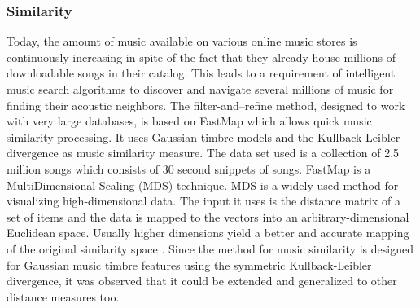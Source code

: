 \documentclass{proc}
\begin{document}
\subsubsection{Similarity}
Today, the amount of music available on various online music stores is continuously increasing in spite of the fact that they already house millions of downloadable songs in their catalog. This leads to a requirement of intelligent music search algorithms to discover and navigate several millions of music for finding their acoustic neighbors. The filter-and–refine method, designed to work with very large databases, is based on FastMap which allows quick music similarity processing. It uses Gaussian timbre models and the Kullback-Leibler divergence as music similarity measure. The data set used is a collection of 2.5 million songs which consists of 30 second snippets of songs. FastMap is a MultiDimensional Scaling (MDS) technique. MDS is a widely used method for visualizing high-dimensional data. The input it uses is the distance matrix of a set of items and the data is mapped to the vectors into an arbitrary-dimensional Euclidean space. Usually higher dimensions yield a better and accurate mapping of the original similarity space \cite{Schnitzer2009}. Since the method for music similarity is designed for Gaussian music timbre features using the symmetric Kullback-Leibler divergence, it was observed that it could be extended and generalized to other distance measures too. \par
\end{document}
